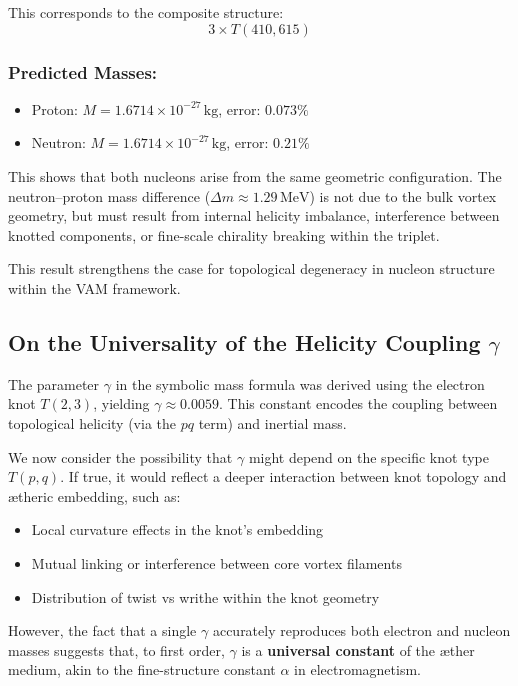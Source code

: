 \documentclass[11pt]{article}
\begin{document}
    This corresponds to the composite structure:
    \[
        \boxed{3 \times T(410, 615)}
    \]

    \subsubsection*{Predicted Masses:}
    \begin{itemize}
        \item Proton: \( M = 1.6714 \times 10^{-27} \, \text{kg} \), error: \( 0.073\% \)
        \item Neutron: \( M = 1.6714 \times 10^{-27} \, \text{kg} \), error: \( 0.21\% \)
    \end{itemize}

    This shows that both nucleons arise from the same geometric configuration. The neutron–proton mass difference (\( \Delta m \approx 1.29 \, \text{MeV} \)) is not due to the bulk vortex geometry, but must result from internal helicity imbalance, interference between knotted components, or fine-scale chirality breaking within the triplet.

    This result strengthens the case for topological degeneracy in nucleon structure within the VAM framework.

    \subsection*{On the Universality of the Helicity Coupling \( \gamma \)}
    The parameter \( \gamma \) in the symbolic mass formula was derived using the electron knot \( T(2,3) \), yielding \( \gamma \approx 0.0059 \). This constant encodes the coupling between topological helicity (via the \( pq \) term) and inertial mass.

    We now consider the possibility that \( \gamma \) might depend on the specific knot type \( T(p,q) \). If true, it would reflect a deeper interaction between knot topology and ætheric embedding, such as:
    \begin{itemize}
        \item Local curvature effects in the knot's embedding
        \item Mutual linking or interference between core vortex filaments
        \item Distribution of twist vs writhe within the knot geometry
    \end{itemize}

    However, the fact that a single \( \gamma \) accurately reproduces both electron and nucleon masses suggests that, to first order, \( \gamma \) is a \textbf{universal constant} of the æther medium, akin to the fine-structure constant \( \alpha \) in electromagnetism.
\end{document}
